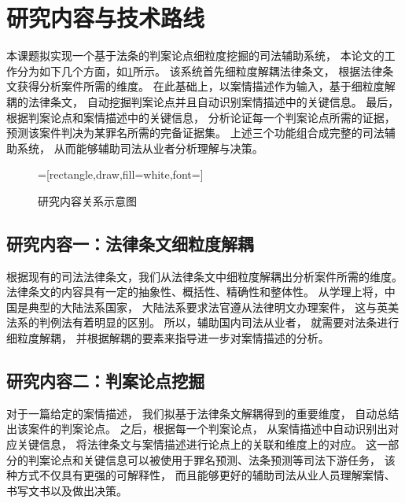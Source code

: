 \section{研究内容与技术路线}

本课题拟实现一个基于法条的判案论点细粒度挖掘的司法辅助系统，
本论文的工作分为如下几个方面，如\cref{fig_1}所示。
该系统首先细粒度解耦法律条文，
根据法律条文获得分析案件所需的维度。
在此基础上，以案情描述作为输入，基于细粒度解耦的法律条文，
自动挖掘判案论点并且自动识别案情描述中的关键信息。
最后，根据判案论点和案情描述中的关键信息，
分析论证每一个判案论点所需的证据，
预测该案件判决为某罪名所需的完备证据集。
上述三个功能组合成完整的司法辅助系统，
从而能够辅助司法从业者分析理解与决策。
\begin{figure}[h]
	\centering

	\scriptsize
	=[rectangle,draw,fill=white,font=\fontsize{12pt}{18pt}\selectfont]
	\caption{研究内容关系示意图}
	\label{fig_1}
\end{figure}

\subsection{研究内容一：法律条文细粒度解耦}
根据现有的司法法律条文，我们从法律条文中细粒度解耦出分析案件所需的维度。
法律条文的内容具有一定的抽象性、概括性、精确性和整体性。
从学理上将，中国是典型的大陆法系国家，
大陆法系要求法官遵从法律明文办理案件，
这与英美法系的判例法有着明显的区别。
所以，辅助国内司法从业者，
就需要对法条进行细粒度解耦，
并根据解耦的要素来指导进一步对案情描述的分析。

\subsection{研究内容二：判案论点挖掘}
对于一篇给定的案情描述，
我们拟基于法律条文解耦得到的重要维度，
自动总结出该案件的判案论点。
之后，根据每一个判案论点，
从案情描述中自动识别出对应关键信息，
将法律条文与案情描述进行论点上的关联和维度上的对应。
这一部分的判案论点和关键信息可以被使用于罪名预测、法条预测等司法下游任务，
该种方式不仅具有更强的可解释性，
而且能够更好的辅助司法从业人员理解案情、书写文书以及做出决策。

